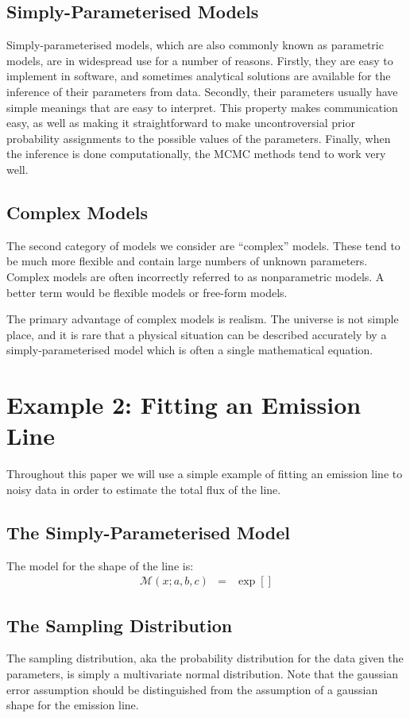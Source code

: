 \documentclass[letterpaper, 11pt]{article}
\begin{document}
\subsection{Simply-Parameterised Models}
Simply-parameterised models, which are also
commonly known as parametric models, are in widespread use for a number of reasons.
Firstly, they are easy to implement in software, and sometimes analytical
solutions are available for the inference of their parameters from data.
Secondly, their parameters usually have simple meanings that are easy to interpret.
This property makes communication easy, as well as making it straightforward to
make uncontroversial prior probability
assignments to the possible values of the parameters. Finally, when the inference
is done computationally, the MCMC methods tend to work very well.

\subsection{Complex Models}
The second category of models we consider are ``complex'' models. These tend to
be much more flexible and contain large numbers of unknown parameters. Complex
models are often incorrectly referred to as nonparametric models. A better term
would be flexible models or free-form models.

The primary advantage of complex models is realism. The universe is not
simple place, and it is rare that a physical situation can be described accurately
by a simply-parameterised model which is often a single mathematical equation.

\section{Example 2: Fitting an Emission Line}
Throughout this paper we will use a simple example of fitting an emission line
to noisy data in order to estimate the total flux of the line.

\subsection{The Simply-Parameterised Model}
The model for the shape of the line is:
\begin{eqnarray}
\mathcal{M}(x; a, b, c) &=& \exp\left[\right]
\end{eqnarray}

\subsection{The Sampling Distribution}
The sampling distribution, aka the probability distribution for the data given
the parameters, is simply a multivariate normal distribution. Note that the
gaussian error assumption should be distinguished from the assumption of a gaussian
shape for the emission line.
\end{document}
